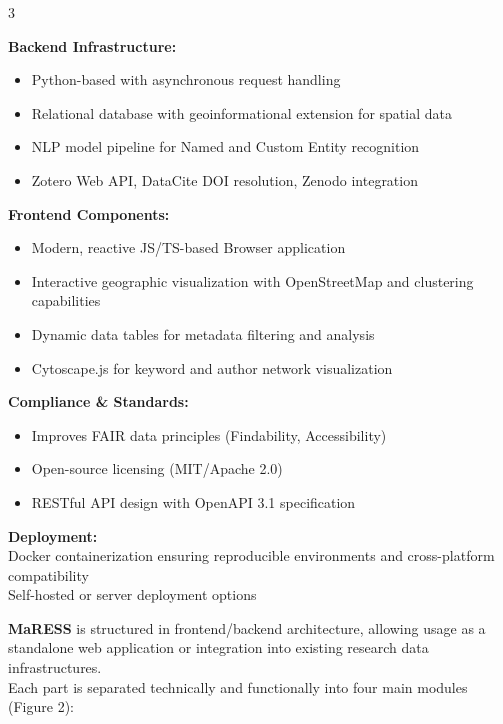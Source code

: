 \documentclass[a0,portrait]{a0poster}
\begin{document}
\begin{multicols}{3}
	\vspace{0.5cm}

	\begin{tcolorbox}[mainbox, title={\Large\textbf{Technical Architecture}}]
		\vspace{0.5cm}
		\textbf{Backend Infrastructure:}
		\begin{itemize}[leftmargin=*]
			\item Python-based with asynchronous request handling
			\item Relational database with geoinformational extension for spatial data
			\item NLP model pipeline for Named and Custom Entity recognition
			\item Zotero Web API, DataCite DOI resolution, Zenodo integration
		\end{itemize}

		\textbf{Frontend Components:}
		\begin{itemize}[leftmargin=*]
			\item Modern, reactive JS/TS-based Browser application
			\item Interactive geographic visualization with OpenStreetMap and clustering capabilities
			\item Dynamic data tables for metadata filtering and analysis
			\item Cytoscape.js for keyword and author network visualization
		\end{itemize}

		\textbf{Compliance \& Standards:}
		\begin{itemize}[leftmargin=*]
			\item Improves FAIR data principles (Findability, Accessibility)
			\item Open-source licensing (MIT/Apache 2.0)
			\item RESTful API design with OpenAPI 3.1 specification
		\end{itemize}
		\textbf{Deployment:}
		\\Docker containerization ensuring reproducible environments and cross-platform compatibility
		\\ Self{-}hosted or server deployment options
	\end{tcolorbox}

	\begin{tcolorbox}[mainbox, title={\Large\textbf{Modular System Design}}]
		\vspace{0.5cm}
		\textbf{MaRESS} is structured in frontend/backend architecture, allowing usage as a standalone web application or
		integration into existing research data infrastructures.\\
		Each part is separated technically and functionally into four main modules (Figure 2):


\end{tcolorbox}
\end{multicols}
\end{document}
